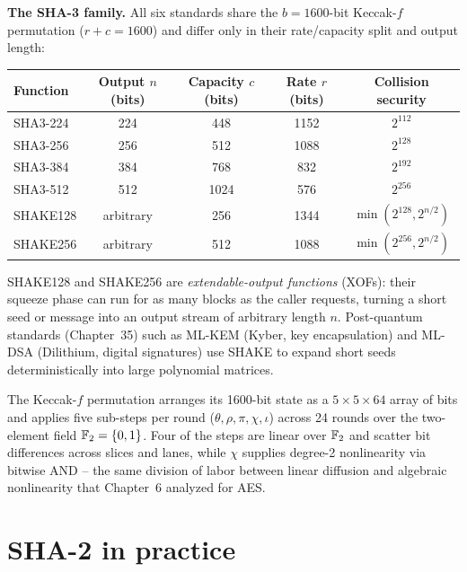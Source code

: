 \begin{focusbox}
\textbf{The SHA-3 family.} All six standards share the $b = 1600$-bit Keccak-$f$ permutation ($r + c = 1600$) and differ only in their rate/capacity split and output length:
\begin{center}
\begin{tabular}{lcccc}
\toprule
Function & Output $n$ (bits) & Capacity $c$ (bits) & Rate $r$ (bits) & Collision security \\
\midrule
SHA3-224 & 224 & 448 & 1152 & $2^{112}$ \\
SHA3-256 & 256 & 512 & 1088 & $2^{128}$ \\
SHA3-384 & 384 & 768 & 832  & $2^{192}$ \\
SHA3-512 & 512 & 1024& 576  & $2^{256}$ \\
SHAKE128 & arbitrary & 256 & 1344 & $\min(2^{128}, 2^{n/2})$ \\
SHAKE256 & arbitrary & 512 & 1088 & $\min(2^{256}, 2^{n/2})$ \\
\bottomrule
\end{tabular}
\end{center}
SHAKE128 and SHAKE256 are \emph{extendable-output functions} (XOFs): their squeeze phase can run for as many blocks as the caller requests, turning a short seed or message into an output stream of arbitrary length $n$. Post-quantum standards (Chapter~35) such as ML-KEM (Kyber, key encapsulation) and ML-DSA (Dilithium, digital signatures) use SHAKE to expand short seeds deterministically into large polynomial matrices.
\end{focusbox}

\begin{connectionbox}
The Keccak-$f$ permutation arranges its 1600-bit state as a $5 \times 5 \times 64$ array of bits and applies five sub-steps per round ($\theta, \rho, \pi, \chi, \iota$) across 24 rounds over the two-element field $\mathbb{F}_2 = \{0,1\}$. Four of the steps are linear over $\mathbb{F}_2$ and scatter bit differences across slices and lanes, while $\chi$ supplies degree-2 nonlinearity via bitwise AND -- the same division of labor between linear diffusion and algebraic nonlinearity that Chapter~6 analyzed for AES.
\end{connectionbox}

\section{SHA-2 in practice}
\label{ch14:sha2}

